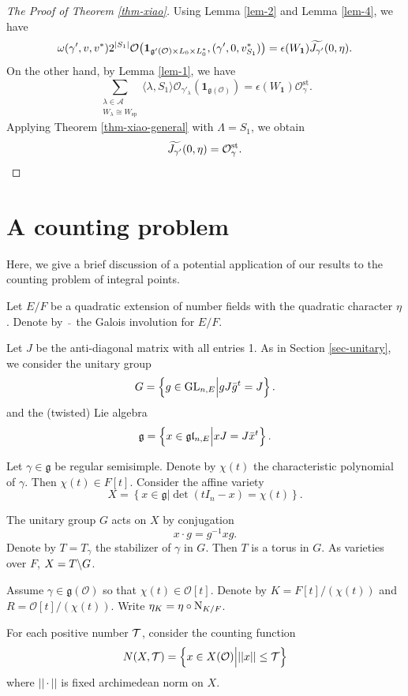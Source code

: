 \documentclass[a4paper]{amsart}
\newcommand{\CA}{{\mathcal {A}}} \newcommand{\CB}{{\mathcal {B}}}
\newcommand{\CO}{{\mathcal {O}}} \newcommand{\CP}{{\mathcal {P}}}
\newcommand{\fg}{{\mathfrak{g}}} \newcommand{\fh}{{\mathfrak{h}}}
\newcommand{\st}{{\mathrm{st}}}\newcommand{\supp}{{\mathrm{supp}}}
\theoremstyle{plain}
\theoremstyle{remark} \newtheorem{remark}[thm]{Remark}
\theoremstyle{exercise} \newtheorem{exercise}[thm]{Exercise}
\theoremstyle{example} \newtheorem{example}[thm]{Example}
\theoremstyle{question} \newtheorem{question}[thm]{Question}
\theoremstyle{assumption} \newtheorem{assumption}[thm]{Assumption}
\numberwithin{equation}{section}
\renewcommand{\sp}{{\mathrm{sp}}}
\begin{document}
\begin{proof}[The Proof of Theorem \ref{thm-xiao}]
Using Lemma \ref{lem-2} and Lemma \ref{lem-4}, we have
\begin{align*}
   \omega(\gamma',v,v^*)2^{|S_1|} \CO\big(\mathbf{1}_{\fg'(\CO)\times L_0\times L_0^*},(\gamma',0,v^*_{S_1})\big)=\epsilon(W_{\mathbf 1})\wt{J_{\gamma'}}(0,\eta).
\end{align*}
On the other hand, by Lemma \ref{lem-1}, we have
\[\sum_{\substack{\lambda\in\CA\\W_\lambda\cong W_\sp}}\langle\lambda,S_1\rangle \CO_{\gamma'_\lambda}(\mathbf{1}_{\fg(\CO)})=\epsilon(W_{\mathbf 1})\CO_{\gamma}^{\st}.\]
Applying Theorem \ref{thm-xiao-general} with $\Lambda = S_1$, we obtain
\[\wt{J_{\gamma'}}(0,\eta)=\CO_\gamma^{\st}.
\]
\end{proof}

 
\section{A counting problem}

Here, we give a brief discussion of a potential application of our results to the counting problem of integral points.

Let $E/F$ be a quadratic extension of number fields with the quadratic character $\eta$. Denote by $\,\bar{}\,$ the Galois involution for $E/F$. 

Let $J$ be the anti-diagonal matrix with all entries 1. 
As in Section \ref{sec-unitary}, we consider the unitary group
\[G = \left\{ g \in {\mathrm{GL}}_{n,E} \Big| gJ\bar{g}^t = J \right\}.\]
and the (twisted) Lie algebra 
\[\fg = \left\{ x \in \fg\fl_{n,E} \Big| xJ= J\bar{x}^t  \right\}.\]


Let $\gamma \in \fg$ be regular semisimple. Denote by $\chi(t)$ the characteristic polynomial of $\gamma$. Then $\chi(t) \in F[t]$. 
Consider the affine variety
\[X = \left\{ x \in \fg \Big| \det(tI_n - x) = \chi(t) \right\}.\]

The unitary group $G$ acts on $X$ by conjugation
\[x \cdot g  = g^{-1}xg.\]
Denote by $T = T_\gamma$ the stabilizer of $\gamma$ in $G$. Then $T$ is a torus in $G$. As varieties over $F$, $X = T \backslash G$. 

Assume $\gamma \in \fg(\CO)$ so that $\chi(t) \in \CO[t]$. Denote
by $K = F[t]/(\chi(t))$ and $R = \CO[t]/(\chi(t))$. Write
$\eta_K = \eta \circ {\mathrm {N}}_{K/F}$.

For each positive number ${\mathcal {T}}$, consider the counting function
\[N(X,\CT) = \left\{ x \in X(\CO) \Big| ||x|| \leq \CT \right\}\]
where $||\cdot||$ is fixed archimedean norm on $X$. 
\end{document}
